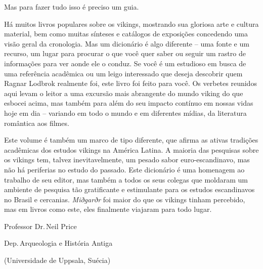 Mas para fazer tudo isso é preciso um guia.

Há muitos livros populares sobre os vikings, mostrando sua gloriosa arte
e cultura material, bem como muitas sínteses e catálogos de exposições
concedendo uma visão geral da cronologia. Mas um dicionário é algo
diferente -- uma fonte e um recurso, um lugar para procurar o que você
quer saber ou seguir um rastro de informações para ver aonde ele o conduz.
Se você é um estudioso em busca de uma referência acadêmica ou um leigo
interessado que deseja descobrir quem Ragnar Lodbrok realmente foi, este
livro foi feito para você. Os verbetes reunidos aqui levam o leitor a
uma excursão mais abrangente do mundo viking do que esbocei acima, mas
também para além do seu impacto contínuo em nossas vidas hoje em dia --
variando em todo o mundo e em diferentes mídias, da literatura romântica
aos filmes.

Este volume é também um marco de tipo diferente, que afirma as ativas
tradições acadêmicas dos estudos vikings na América Latina. A maioria das pesquisas sobre os vikings tem, talvez inevitavelmente, um pesado sabor euro-escandinavo, mas não há periferias no estudo do passado. Este
dicionário é uma homenagem ao trabalho de seu editor, mas também a todos os seus colegas que moldaram um ambiente de pesquisa tão gratificante e estimulante para os
estudos escandinavos no Brasil e cercanias. \emph{Miðgarðr} foi maior do
que os vikings tinham percebido, mas em livros como este, eles
finalmente viajaram para todo lugar.\medskip

\EP[2]
\hfill Professor Dr.\,Neil Price

\hfill Dep.\,Arqueologia e História Antiga 

\hfill (Universidade de Uppsala, Suécia)

